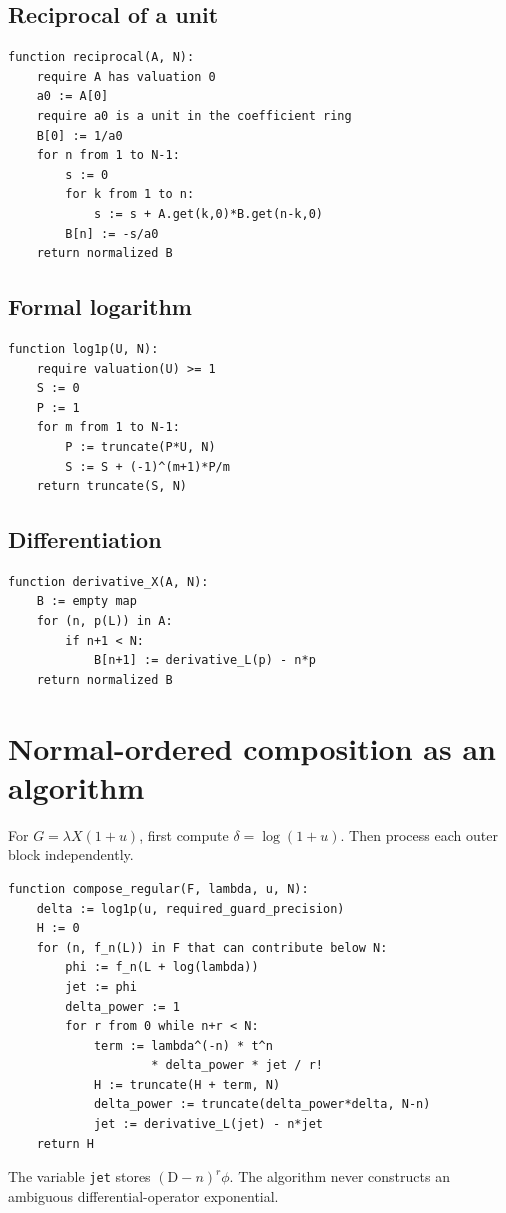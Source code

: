 \documentclass[11pt,openany]{book}
\theoremstyle{definition}
\theoremstyle{plain}
\theoremstyle{remark}
\newcommand{\Dop}{\mathrm{D}}
\begin{document}
\subsection{Reciprocal of a unit}
\begin{lstlisting}[style=pseudostyle]
function reciprocal(A, N):
    require A has valuation 0
    a0 := A[0]
    require a0 is a unit in the coefficient ring
    B[0] := 1/a0
    for n from 1 to N-1:
        s := 0
        for k from 1 to n:
            s := s + A.get(k,0)*B.get(n-k,0)
        B[n] := -s/a0
    return normalized B
\end{lstlisting}

\subsection{Formal logarithm}
\begin{lstlisting}[style=pseudostyle]
function log1p(U, N):
    require valuation(U) >= 1
    S := 0
    P := 1
    for m from 1 to N-1:
        P := truncate(P*U, N)
        S := S + (-1)^(m+1)*P/m
    return truncate(S, N)
\end{lstlisting}

\subsection{Differentiation}
\begin{lstlisting}[style=pseudostyle]
function derivative_X(A, N):
    B := empty map
    for (n, p(L)) in A:
        if n+1 < N:
            B[n+1] := derivative_L(p) - n*p
    return normalized B
\end{lstlisting}

\section{Normal-ordered composition as an algorithm}
For \(G=\lambda X(1+u)\), first compute
\(\delta=\log(1+u)\).  Then process each outer block independently.

\begin{lstlisting}[style=pseudostyle]
function compose_regular(F, lambda, u, N):
    delta := log1p(u, required_guard_precision)
    H := 0
    for (n, f_n(L)) in F that can contribute below N:
        phi := f_n(L + log(lambda))
        jet := phi
        delta_power := 1
        for r from 0 while n+r < N:
            term := lambda^(-n) * t^n
                    * delta_power * jet / r!
            H := truncate(H + term, N)
            delta_power := truncate(delta_power*delta, N-n)
            jet := derivative_L(jet) - n*jet
    return H
\end{lstlisting}
The variable \texttt{jet} stores \((\Dop-n)^r\phi\).  The algorithm never
constructs an ambiguous differential-operator exponential.
\end{document}
